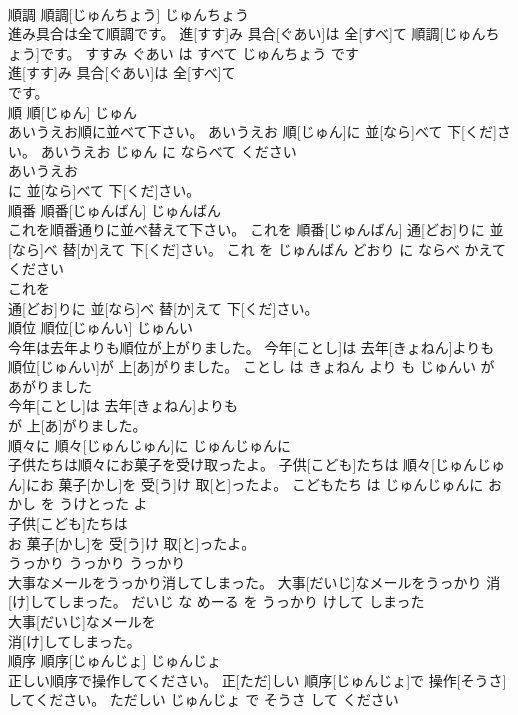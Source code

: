 \documentclass[8pt]{extreport}
\begin{document}
\begin{CJK}{UTF8}{min}
\\	順調	順調[じゅんちょう]	じゅんちょう	
\\	進み具合は全て順調です。	進[すす]み 具合[ぐあい]は 全[すべ]て 順調[じゅんちょう]です。	すすみ ぐあい は すべて じゅんちょう です	
\\	進[すす]み 具合[ぐあい]は 全[すべ]て
\\	です。			
\\	順	順[じゅん]	じゅん	
\\	あいうえお順に並べて下さい。	あいうえお 順[じゅん]に 並[なら]べて 下[くだ]さい。	あいうえお じゅん に ならべて ください	
\\	あいうえお
\\	に 並[なら]べて 下[くだ]さい。			
\\	順番	順番[じゅんばん]	じゅんばん	
\\	これを順番通りに並べ替えて下さい。	これを 順番[じゅんばん] 通[どお]りに 並[なら]べ 替[か]えて 下[くだ]さい。	これ を じゅんばん どおり に ならべ かえて ください	
\\	これを
\\	通[どお]りに 並[なら]べ 替[か]えて 下[くだ]さい。			
\\	順位	順位[じゅんい]	じゅんい	
\\	今年は去年よりも順位が上がりました。	今年[ことし]は 去年[きょねん]よりも 順位[じゅんい]が 上[あ]がりました。	ことし は きょねん より も じゅんい が あがりました	
\\	今年[ことし]は 去年[きょねん]よりも
\\	が 上[あ]がりました。			
\\	順々に	順々[じゅんじゅん]に	じゅんじゅんに	
\\	子供たちは順々にお菓子を受け取ったよ。	子供[こども]たちは 順々[じゅんじゅん]にお 菓子[かし]を 受[う]け 取[と]ったよ。	こどもたち は じゅんじゅんに おかし を うけとった よ	
\\	子供[こども]たちは
\\	お 菓子[かし]を 受[う]け 取[と]ったよ。			
\\	うっかり	うっかり	うっかり	
\\	大事なメールをうっかり消してしまった。	大事[だいじ]なメールをうっかり 消[け]してしまった。	だいじ な めーる を うっかり けして しまった	
\\	大事[だいじ]なメールを
\\	消[け]してしまった。			
\\	順序	順序[じゅんじょ]	じゅんじょ	
\\	正しい順序で操作してください。	正[ただ]しい 順序[じゅんじょ]で 操作[そうさ]してください。	ただしい じゅんじょ で そうさ して ください	

\end{CJK}
\end{document}
